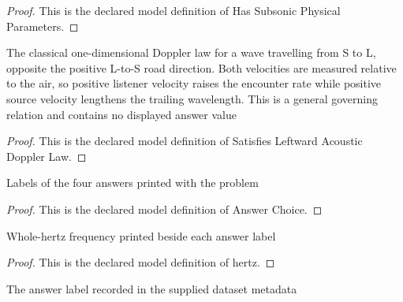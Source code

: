 \begin{proof}
  This is the declared model definition of Has Subsonic Physical Parameters.
\end{proof}
\begin{definition}
  \label{def:physics:phyx-mini-0196:phyxminiproblems-problemphyxmini0196-satisfiesleftwardacousticdopplerlaw}
  The classical one-dimensional Doppler law for a wave travelling from S to L, opposite the positive L-to-S road direction. Both velocities are measured relative to the air, so positive listener velocity raises the encounter rate while positive source velocity lengthens the trailing wavelength. This is a general governing relation and contains no displayed answer value
\end{definition}
\begin{proof}
  This is the declared model definition of Satisfies Leftward Acoustic Doppler Law.
\end{proof}
\begin{definition}
  \label{def:physics:phyx-mini-0196:phyxminiproblems-problemphyxmini0196-answerchoice}
  Labels of the four answers printed with the problem
\end{definition}
\begin{proof}
  This is the declared model definition of Answer Choice.
\end{proof}
\begin{definition}[hertz]
  \label{def:physics:phyx-mini-0196:phyxminiproblems-problemphyxmini0196-answerchoice-hertz}
  Whole-hertz frequency printed beside each answer label
\end{definition}
\begin{proof}
  This is the declared model definition of hertz.
\end{proof}
\begin{definition}
  \label{def:physics:phyx-mini-0196:phyxminiproblems-problemphyxmini0196-recordeddatasetanswer}
  The answer label recorded in the supplied dataset metadata
\end{definition}
